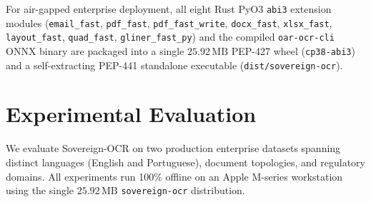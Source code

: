 \documentclass[10pt,twocolumn,letterpaper]{article}
\begin{document}
For air-gapped enterprise deployment, all eight Rust PyO3 \texttt{abi3} extension modules (\texttt{email\_fast}, \texttt{pdf\_fast}, \texttt{pdf\_fast\_write}, \texttt{docx\_fast}, \texttt{xlsx\_fast}, \texttt{layout\_fast}, \texttt{quad\_fast}, \texttt{gliner\_fast\_py}) and the compiled \texttt{oar-ocr-cli} ONNX binary are packaged into a single $25.92\,\text{MB}$ PEP-427 wheel (\texttt{cp38-abi3}) and a self-extracting PEP-441 standalone executable (\texttt{dist/sovereign-ocr}).

\section{Experimental Evaluation}

We evaluate Sovereign-OCR on two production enterprise datasets spanning distinct languages (English and Portuguese), document topologies, and regulatory domains. All experiments run 100\% offline on an Apple M-series workstation using the single $25.92\,\text{MB}$ \texttt{sovereign-ocr} distribution.
\end{document}
